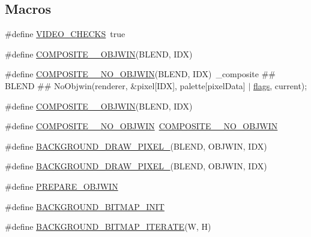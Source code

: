 \subsection*{Macros}
\begin{DoxyCompactItemize}
\item 
\#define \mbox{\hyperlink{software-private_8h_a9602288efe2526971d064a0e3f2b6866}{V\+I\+D\+E\+O\+\_\+\+C\+H\+E\+C\+KS}}~true
\item 
\#define \mbox{\hyperlink{software-private_8h_ac5d796f7d762355873cc3ec872ca88d5}{C\+O\+M\+P\+O\+S\+I\+T\+E\+\_\+\_\+\+O\+B\+J\+W\+IN}}(B\+L\+E\+ND,  I\+DX)
\item 
\#define \mbox{\hyperlink{software-private_8h_a1c9c7e2f21e6afef3bd9d5d3b99aedd0}{C\+O\+M\+P\+O\+S\+I\+T\+E\+\_\+\_\+\+N\+O\+\_\+\+O\+B\+J\+W\+IN}}(B\+L\+E\+ND,  I\+DX)~\+\_\+composite \#\# B\+L\+E\+ND \#\# No\+Objwin(renderer, \&pixel\mbox{[}I\+DX\mbox{]}, palette\mbox{[}pixel\+Data\mbox{]} $\vert$ \mbox{\hyperlink{lr35902_2decoder_8c_a11f29eea941556f0630cfd3285f565c0}{flags}}, current);
\item 
\#define \mbox{\hyperlink{software-private_8h_ad2249e4b6507dcba8e9becf7aed21d1a}{C\+O\+M\+P\+O\+S\+I\+T\+E\+\_\+\_\+\+O\+B\+J\+W\+IN}}(B\+L\+E\+ND,  I\+DX)
\item 
\#define \mbox{\hyperlink{software-private_8h_a3ae47df6d5deb7b584b22be27c4ffd59}{C\+O\+M\+P\+O\+S\+I\+T\+E\+\_\+\_\+\+N\+O\+\_\+\+O\+B\+J\+W\+IN}}~\mbox{\hyperlink{software-private_8h_a1c9c7e2f21e6afef3bd9d5d3b99aedd0}{C\+O\+M\+P\+O\+S\+I\+T\+E\+\_\+\_\+\+N\+O\+\_\+\+O\+B\+J\+W\+IN}}
\item 
\#define \mbox{\hyperlink{software-private_8h_a98f805713663ffd34c06034a487d339e}{B\+A\+C\+K\+G\+R\+O\+U\+N\+D\+\_\+\+D\+R\+A\+W\+\_\+\+P\+I\+X\+E\+L\+\_}}(B\+L\+E\+ND,  O\+B\+J\+W\+IN,  I\+DX)
\item 
\#define \mbox{\hyperlink{software-private_8h_ad0e2f6dd168b61205e3a9cf671581122}{B\+A\+C\+K\+G\+R\+O\+U\+N\+D\+\_\+\+D\+R\+A\+W\+\_\+\+P\+I\+X\+E\+L\+\_}}(B\+L\+E\+ND,  O\+B\+J\+W\+IN,  I\+DX)
\item 
\#define \mbox{\hyperlink{software-private_8h_a139384de27a024d5d573887ddc8ce07a}{P\+R\+E\+P\+A\+R\+E\+\_\+\+O\+B\+J\+W\+IN}}
\item 
\#define \mbox{\hyperlink{software-private_8h_ad68095029f1769b7966be63d8506fec5}{B\+A\+C\+K\+G\+R\+O\+U\+N\+D\+\_\+\+B\+I\+T\+M\+A\+P\+\_\+\+I\+N\+IT}}
\item 
\#define \mbox{\hyperlink{software-private_8h_a3b600b3c624495ee166f482e306a6fc1}{B\+A\+C\+K\+G\+R\+O\+U\+N\+D\+\_\+\+B\+I\+T\+M\+A\+P\+\_\+\+I\+T\+E\+R\+A\+TE}}(W,  H)
\end{DoxyCompactItemize}
